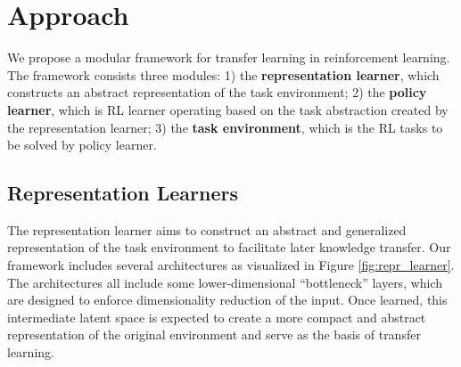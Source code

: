 \section{Approach}
\label{sec:approach}
We propose a modular framework for transfer learning in reinforcement learning. 
The framework consists three modules: 
1) the \textbf{representation learner}, which constructs an abstract representation of the task environment;
2) the \textbf{policy learner}, which is RL learner operating based on the task abstraction created by the representation learner;
3) the \textbf{task environment}, which is the RL tasks to be solved by policy learner.

\subsection{Representation Learners}
The representation learner aims to construct an abstract and generalized representation of the task environment to facilitate later knowledge transfer.
Our framework includes several architectures as visualized in Figure \ref{fig:repr_learner}.
The architectures all include some lower-dimensional ``bottleneck'' layers, 
which are designed to enforce dimensionality reduction of the input.
Once learned, this intermediate latent space is expected to create a more compact and abstract representation of the original environment and serve as the basis of transfer learning. 

